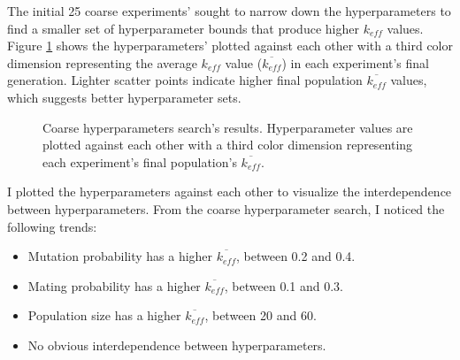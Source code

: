 The initial 25 coarse experiments' sought to narrow down the hyperparameters 
to find a smaller set of hyperparameter bounds that produce higher $k_{eff}$ values.
Figure \ref{fig:hyperparameter_sens} shows the hyperparameters' plotted against 
each other with a third color dimension representing the average $k_{eff}$ value
($\overline{k_{eff}}$) in each experiment's final generation. 
Lighter scatter points indicate higher final population $\overline{k_{eff}}$ values, 
which suggests better hyperparameter sets. 
\begin{figure}[htbp]
    \centering
    \caption{Coarse hyperparameters search's results. Hyperparameter values are plotted 
    against each other with a third color dimension representing each experiment's 
    final population's $\overline{k_{eff}}$.}
    \label{fig:hyperparameter_sens}
\end{figure}
I plotted the hyperparameters against each other to visualize the interdependence 
between hyperparameters. 
From the coarse hyperparameter search, I noticed the following trends: 
\begin{itemize}
    \item Mutation probability has a higher $\overline{k_{eff}}$, between 0.2 and 0.4. 
    \item Mating probability has a higher $\overline{k_{eff}}$, between 0.1 and 0.3. 
    \item Population size has a higher $\overline{k_{eff}}$, between 20 and 60. 
    \item No obvious interdependence between hyperparameters. 
\end{itemize} 

